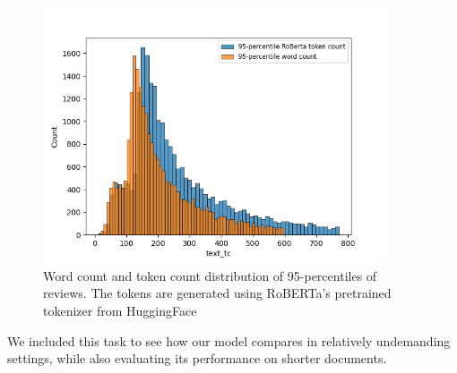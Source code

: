 \begin{figure}[ht]
  \centering
  \includegraphics[width=0.9\textwidth]{img/imdb_word_token_distributions.png}
  \caption{Word count and token count distribution of 95-percentiles of
  reviews. The tokens are generated using RoBERTa's pretrained tokenizer from
  HuggingFace}\label{fig:imdb_word_token_dist}
\end{figure}

We included this task to see how our model compares in relatively undemanding
settings, while also evaluating its performance on shorter documents.
